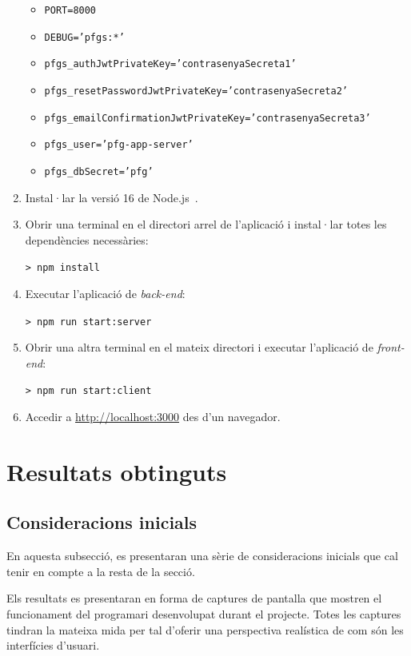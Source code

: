 \documentclass[a4paper,12pt]{ThesisStyle}
\begin{document}
\begin{enumerate}
\begin{itemize}
    \item \texttt{PORT=8000}
    \item \texttt{DEBUG='pfgs:*'}
    \item \texttt{pfgs\_authJwtPrivateKey='contrasenyaSecreta1'}
    \item \texttt{pfgs\_resetPasswordJwtPrivateKey='contrasenyaSecreta2'}
    \item \texttt{pfgs\_emailConfirmationJwtPrivateKey='contrasenyaSecreta3'}
    \item \texttt{pfgs\_user='pfg-app-server'}
    \item \texttt{pfgs\_dbSecret='pfg'}
  \end{itemize}
  \item Instal·lar la versió 16 de Node.js~\cite{Node}.
  \item Obrir una terminal en el directori arrel de l'aplicació i instal·lar totes les dependències necessàries:\\
    \centerline{\texttt{> npm install}}
  \item Executar l'aplicació de \textit{back-end}:\\
    \centerline{\texttt{> npm run start:server}}
  \item Obrir una altra terminal en el mateix directori i executar l'aplicació de \textit{front-end}:\\
    \centerline{\texttt{> npm run start:client}}
  \item Accedir a \href{http://localhost:3000}{http://localhost:3000} des d'un navegador.
\end{enumerate}

\section{Resultats obtinguts}
\label{sec:resultats}

\subsection{Consideracions inicials}
\label{subsec:resultats_consideracions}

En aquesta subsecció, es presentaran una sèrie de consideracions inicials que cal tenir en compte a la resta de la secció.

Els resultats es presentaran en forma de captures de pantalla que mostren el funcionament del programari desenvolupat durant el projecte. Totes les captures tindran la mateixa mida per tal d'oferir una perspectiva realística de com són les interfícies d'usuari.
\end{document}
